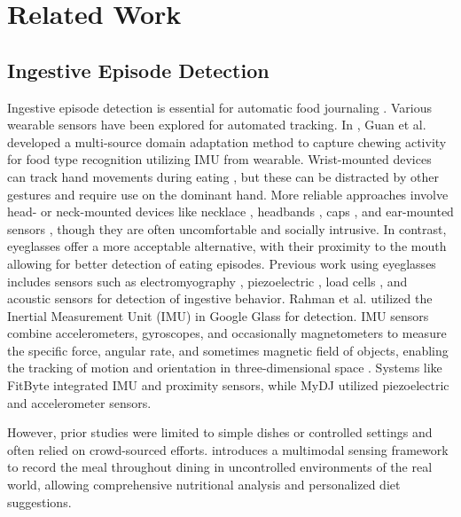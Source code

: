 \section{Related Work}
\label{sec:related_work}
\subsection{Ingestive Episode Detection}
\label{dietarydetection}
Ingestive episode detection is essential for automatic food journaling \cite{tang2025video}. 
Various wearable sensors have been explored for automated tracking. In \cite{guan2025towards}, Guan et al. developed a multi-source domain adaptation method to capture chewing activity for food type recognition utilizing IMU from wearable. Wrist-mounted devices can track hand movements during eating \cite{wrist1,wrist2,wrist3}, but these can be distracted by other gestures and require use on the dominant hand. More reliable approaches involve head- or neck-mounted devices like necklace \cite{necklace_proximity2}, headbands \cite{headband}, caps \cite{cap}, and ear-mounted sensors \cite{EarBit,EarSAVAS,Auracle}, though they are often uncomfortable and socially intrusive. 
In contrast, eyeglasses offer a more acceptable alternative, with their proximity to the mouth allowing for better detection of eating episodes. Previous work using eyeglasses includes sensors such as electromyography \cite{emgglasses}, piezoelectric \cite{piezoelectricglasses}, load cells \cite{loadcellglasses}, and acoustic sensors \cite{acousticglasses} for detection of ingestive behavior. 
Rahman et al. \cite{imuglasses} utilized the Inertial Measurement Unit (IMU) in Google Glass for detection. IMU sensors combine accelerometers, gyroscopes, and occasionally magnetometers to measure the specific force, angular rate, and sometimes magnetic field of objects, enabling the tracking of motion and orientation in three-dimensional space \cite{bedri2020fitbyte}.
Systems like FitByte \cite{bedri2020fitbyte} integrated IMU and proximity sensors, while MyDJ \cite{shin2022mydj} utilized piezoelectric and accelerometer sensors. 

However, prior studies were limited to simple dishes or controlled settings and often relied on crowd-sourced efforts. \shortname introduces a multimodal sensing framework to record the meal throughout dining in uncontrolled environments of the real world, allowing comprehensive nutritional analysis and personalized diet suggestions.

